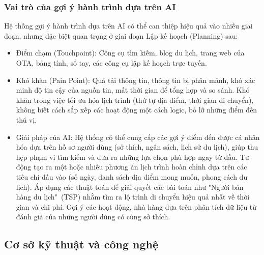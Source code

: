\subsubsection{Vai trò của gợi ý hành trình dựa trên AI}
Hệ thống gợi ý hành trình dựa trên AI có thể can thiệp hiệu quả vào nhiều giai đoạn, nhưng đặc biệt quan trọng ở giai đoạn Lập kế hoạch (Planning) sau:
\begin{itemize}
    \item Điểm chạm (Touchpoint): Công cụ tìm kiếm, blog du lịch, trang web của OTA, bảng tính, sổ tay, các công cụ lập kế hoạch trực tuyến.
    \item Khó khăn (Pain Point): Quá tải thông tin, thông tin bị phân mảnh, khó xác minh độ tin cậy của nguồn tin, mất thời gian để tổng hợp và so sánh. Khó khăn trong việc tối ưu hóa lịch trình (thứ tự địa điểm, thời gian di chuyển), không biết cách sắp xếp các hoạt động một cách logic, bỏ lỡ những điểm đến thú vị.
    \item Giải pháp của AI: Hệ thống có thể cung cấp các gợi ý điểm đến được cá nhân hóa dựa trên hồ sơ người dùng (sở thích, ngân sách, lịch sử du lịch), giúp thu hẹp phạm vi tìm kiếm và đưa ra những lựa chọn phù hợp ngay từ đầu. Tự động tạo ra một hoặc nhiều phương án lịch trình hoàn chỉnh dựa trên các tiêu chí đầu vào (số ngày, danh sách địa điểm mong muốn, phong cách du lịch). Áp dụng các thuật toán để giải quyết các bài toán như "Người bán hàng du lịch"\ (TSP) nhằm tìm ra lộ trình di chuyển hiệu quả nhất về thời gian và chi phí. Gợi ý các hoạt động, nhà hàng dựa trên phân tích dữ liệu từ đánh giá của những người dùng có cùng sở thích.
\end{itemize}

\subsection{Cơ sở kỹ thuật và công nghệ}
